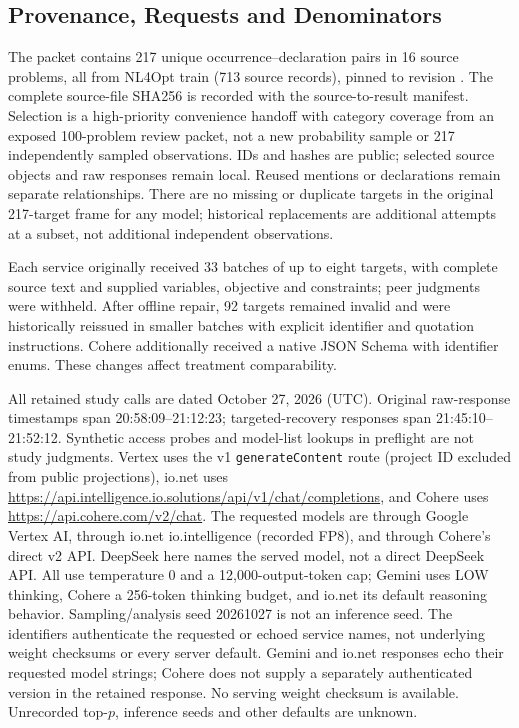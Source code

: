 \subsection{Provenance, Requests and Denominators}\label{app:relationship-evidence}
The packet contains 217 unique occurrence--declaration pairs in 16 source problems, all from NL4Opt train (713 source records), pinned to revision . The complete source-file SHA256 is recorded with the source-to-result manifest. Selection is a high-priority convenience handoff with category coverage from an exposed 100-problem review packet, not a new probability sample or 217 independently sampled observations. IDs and hashes are public; selected source objects and raw responses remain local. Reused mentions or declarations remain separate relationships. There are no missing or duplicate targets in the original 217-target frame for any model; historical replacements are additional attempts at a subset, not additional independent observations.

Each service originally received 33 batches of up to eight targets, with complete source text and supplied variables, objective and constraints; peer judgments were withheld. After offline repair, 92 targets remained invalid and were historically reissued in smaller batches with explicit identifier and quotation instructions. Cohere additionally received a native JSON Schema with identifier enums. These changes affect treatment comparability.

All retained study calls are dated October 27, 2026 (UTC). Original raw-response timestamps span 20:58:09--21:12:23; targeted-recovery responses span 21:45:10--21:52:12. Synthetic access probes and model-list lookups in preflight are not study judgments. Vertex uses the v1 \texttt{generateContent} route (project ID excluded from public projections), io.net uses \url{https://api.intelligence.io.solutions/api/v1/chat/completions}, and Cohere uses \url{https://api.cohere.com/v2/chat}. The requested models are  through Google Vertex AI,  through io.net io.intelligence (recorded FP8), and  through Cohere's direct v2 API. DeepSeek here names the served model, not a direct DeepSeek API. All use temperature 0 and a 12,000-output-token cap; Gemini uses LOW thinking, Cohere a 256-token thinking budget, and io.net its default reasoning behavior. Sampling/analysis seed 20261027 is not an inference seed. The identifiers authenticate the requested or echoed service names, not underlying weight checksums or every server default. Gemini and io.net responses echo their requested model strings; Cohere does not supply a separately authenticated version in the retained response. No serving weight checksum is available. Unrecorded top-$p$, inference seeds and other defaults are unknown.

